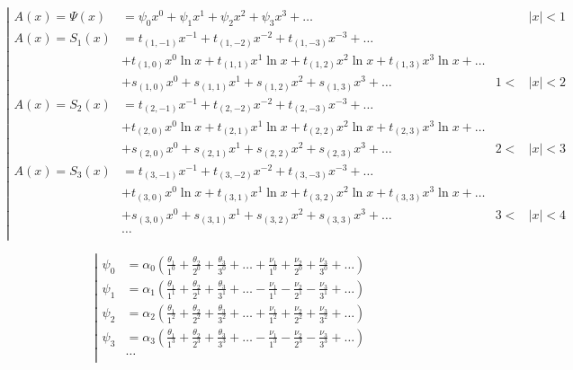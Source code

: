 \begin{equation*} \left| \begin{aligned}
A(x) = \Psi(x) &=
  \psi_0 x^0
+ \psi_1 x^1
+ \psi_2 x^2
+ \psi_3 x^3
+ \ldots &
&|x| < 1 \\
%
A(x) = S_1(x) &= 
  t_{(1,-1)} x^{-1}
+ t_{(1,-2)} x^{-2}
+ t_{(1,-3)} x^{-3}
+ \ldots \\ &
+ t_{(1,0)} x^0 \ln{x}
+ t_{(1,1)} x^1 \ln{x}
+ t_{(1,2)} x^2 \ln{x}
+ t_{(1,3)} x^3 \ln{x}
+ \ldots \\ &
+ s_{(1,0)} x^0
+ s_{(1,1)} x^1
+ s_{(1,2)} x^2
+ s_{(1,3)} x^3
+ \ldots &
1 < &|x| < 2 \\
%
A(x) = S_2(x) &= 
  t_{(2,-1)} x^{-1}
+ t_{(2,-2)} x^{-2}
+ t_{(2,-3)} x^{-3}
+ \ldots \\ &
+ t_{(2,0)} x^0 \ln{x}
+ t_{(2,1)} x^1 \ln{x}
+ t_{(2,2)} x^2 \ln{x}
+ t_{(2,3)} x^3 \ln{x}
+ \ldots \\ &
+ s_{(2,0)} x^0
+ s_{(2,1)} x^1
+ s_{(2,2)} x^2
+ s_{(2,3)} x^3
+ \ldots &
2 < &|x| < 3 \\
%
A(x) = S_3(x) &= 
  t_{(3,-1)} x^{-1}
+ t_{(3,-2)} x^{-2}
+ t_{(3,-3)} x^{-3}
+ \ldots \\ &
+ t_{(3,0)} x^0 \ln{x}
+ t_{(3,1)} x^1 \ln{x}
+ t_{(3,2)} x^2 \ln{x}
+ t_{(3,3)} x^3 \ln{x}
+ \ldots \\ &
+ s_{(3,0)} x^0
+ s_{(3,1)} x^1
+ s_{(3,2)} x^2
+ s_{(3,3)} x^3
+ \ldots &
3 < &|x| < 4 \\
%
&\ldots \\
\end{aligned} \right. \end{equation*}

\begin{equation*} \left| \begin{aligned}
\psi_0 &= \alpha_0
  \left(
  \frac{\theta_1}{1^0}
+ \frac{\theta_2}{2^0}
+ \frac{\theta_3}{3^0}
+ \ldots
+ \frac{\nu_1}{1^0}
+ \frac{\nu_2}{2^0}
+ \frac{\nu_3}{3^0}
+ \ldots
  \right) \\
%
\psi_1 &= \alpha_1
  \left(
  \frac{\theta_1}{1^1}
+ \frac{\theta_2}{2^1}
+ \frac{\theta_3}{3^1}
+ \ldots
- \frac{\nu_1}{1^1}
- \frac{\nu_2}{2^1}
- \frac{\nu_3}{3^1}
+ \ldots
  \right) \\
%
\psi_2 &= \alpha_2
  \left(
  \frac{\theta_1}{1^2}
+ \frac{\theta_2}{2^2}
+ \frac{\theta_3}{3^2}
+ \ldots
+ \frac{\nu_1}{1^2}
+ \frac{\nu_2}{2^2}
+ \frac{\nu_3}{3^2}
+ \ldots
  \right) \\
%
\psi_3 &= \alpha_3
  \left(
  \frac{\theta_1}{1^3}
+ \frac{\theta_2}{2^3}
+ \frac{\theta_3}{3^3}
+ \ldots
- \frac{\nu_1}{1^3}
- \frac{\nu_2}{2^3}
- \frac{\nu_3}{3^3}
+ \ldots
  \right) \\
%
&\ldots \\
\end{aligned} \right. \end{equation*}

